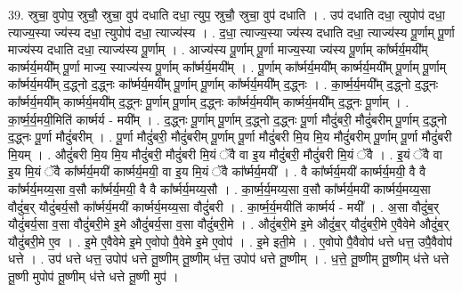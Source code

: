 \documentclass[17pt]{extarticle}
\begin{document}
39. स्रुचा॒ वुपोप॒ स्रुचौ॒ स्रुचा॒ वुप॑ दधाति दधा॒ त्युप॒ स्रुचौ॒ स्रुचा॒ वुप॑ दधाति । . उप॑ दधाति दधा॒ त्युपोप॑ दधा॒ त्याज्य॒स्या ज्य॑स्य दधा॒ त्युपोप॑ दधा॒ त्याज्य॑स्य । . द॒धा॒ त्याज्य॒स्या ज्य॑स्य दधाति दधा॒ त्याज्य॑स्य पू॒र्णाम् पू॒र्णा माज्य॑स्य दधाति दधा॒ त्याज्य॑स्य पू॒र्णाम् । . आज्य॑स्य पू॒र्णाम् पू॒र्णा माज्य॒स्या ज्य॑स्य पू॒र्णाम् का᳚र्ष्मर्य॒मयी᳚म् कार्ष्मर्य॒मयी᳚म् पू॒र्णा माज्य॒ स्याज्य॑स्य पू॒र्णाम् का᳚र्ष्मर्य॒मयी᳚म् । . पू॒र्णाम् का᳚र्ष्मर्य॒मयी᳚म् कार्ष्मर्य॒मयी᳚म् पू॒र्णाम् पू॒र्णाम् का᳚र्ष्मर्य॒मयी᳚म् द॒द्ध्नो द॒द्ध्नः का᳚र्ष्मर्य॒मयी᳚म् पू॒र्णाम् पू॒र्णाम् का᳚र्ष्मर्य॒मयी᳚म् द॒द्ध्नः । . का॒र्ष्म॒र्य॒मयी᳚म् द॒द्ध्नो द॒द्ध्नः का᳚र्ष्मर्य॒मयी᳚म् कार्ष्मर्य॒मयी᳚म् द॒द्ध्नः पू॒र्णाम् पू॒र्णाम् द॒द्ध्नः का᳚र्ष्मर्य॒मयी᳚म् कार्ष्मर्य॒मयी᳚म् द॒द्ध्नः पू॒र्णाम् । . का॒र्ष्म॒र्य॒मयी॒मिति॑ कार्ष्मर्य - मयी᳚म् । . द॒द्ध्नः पू॒र्णाम् पू॒र्णाम् द॒द्ध्नो द॒द्ध्नः पू॒र्णा मौदुं॑बरी॒ मौदुं॑बरीम् पू॒र्णाम् द॒द्ध्नो द॒द्ध्नः पू॒र्णा मौदुं॑बरीम् । . पू॒र्णा मौदुं॑बरी॒ मौदुं॑बरीम् पू॒र्णाम् पू॒र्णा मौदुं॑बरी मि॒य मि॒य मौदुं॑बरीम् पू॒र्णाम् पू॒र्णा मौदुं॑बरी मि॒यम् । . औदुं॑बरी मि॒य मि॒य मौदुं॑बरी॒ मौदुं॑बरी मि॒यं ॅवै वा इ॒य मौदुं॑बरी॒ मौदुं॑बरी मि॒यं ॅवै । . इ॒यं ॅवै वा इ॒य मि॒यं ॅवै का᳚र्ष्मर्य॒मयी॑ कार्ष्मर्य॒मयी॒ वा इ॒य मि॒यं ॅवै का᳚र्ष्मर्य॒मयी᳚ । . वै का᳚र्ष्मर्य॒मयी॑ कार्ष्मर्य॒मयी॒ वै वै का᳚र्ष्मर्य॒मय्य॒सा व॒सौ का᳚र्ष्मर्य॒मयी॒ वै वै का᳚र्ष्मर्य॒मय्य॒सौ । . का॒र्ष्म॒र्य॒मय्य॒सा व॒सौ का᳚र्ष्मर्य॒मयी॑ कार्ष्मर्य॒मय्य॒सा वौदुं॑ब॒र् यौदुं॑बर्य॒सौ का᳚र्ष्मर्य॒मयी॑ कार्ष्मर्य॒मय्य॒सा वौदुं॑बरी । . का॒र्ष्म॒र्य॒मयीति॑ कार्ष्मर्य - मयी᳚ । . अ॒सा वौदुं॑ब॒र् यौदुं॑बर्य॒सा व॒सा वौदुं॑बरी॒मे इ॒मे औदुं॑बर्य॒सा व॒सा वौदुं॑बरी॒मे । . औदुं॑बरी॒मे इ॒मे औदुं॑ब॒र् यौदुं॑बरी॒मे ए॒वैवेमे औदुं॑ब॒र् यौदुं॑बरी॒मे ए॒व । . इ॒मे ए॒वैवेमे इ॒मे ए॒वोपो पै॒वेमे इ॒मे ए॒वोप॑ । . इ॒मे इती॒मे । . ए॒वोपो पै॒वैवोप॑ धत्ते धत्त॒ उपै॒वैवोप॑ धत्ते । . उप॑ धत्ते धत्त॒ उपोप॑ धत्ते तू॒ष्णीम् तू॒ष्णीम् ध॑त्त॒ उपोप॑ धत्ते तू॒ष्णीम् । . ध॒त्ते॒ तू॒ष्णीम् तू॒ष्णीम् ध॑त्ते धत्ते तू॒ष्णी मुपोप॑ तू॒ष्णीम् ध॑त्ते धत्ते तू॒ष्णी मुप॑ । \newline
\pagebreak
{}
\end{document}
